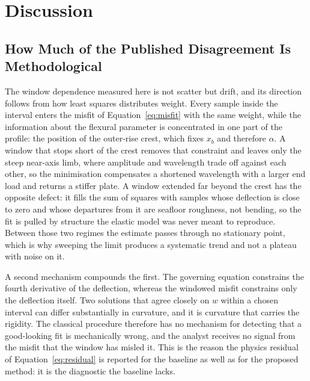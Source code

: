 \documentclass[final]{agujournal2019}
\begin{document}
\section{Discussion}\label{sec:discussion}

\subsection{How Much of the Published Disagreement Is Methodological}\label{sec:disc:window}

The window dependence measured here is not scatter but drift, and its direction
follows from how least squares distributes weight. Every sample inside the
interval enters the misfit of Equation~\eqref{eq:misfit} with the same weight,
while the information about the flexural parameter is concentrated in one part
of the profile: the position of the outer-rise crest, which fixes $x_{b}$ and
therefore $\alpha$. A window that stops short of the crest removes that
constraint and leaves only the steep near-axis limb, where amplitude and
wavelength trade off against each other, so the minimisation compensates a
shortened wavelength with a larger end load and returns a stiffer plate. A
window extended far beyond the crest has the opposite defect: it fills the sum
of squares with samples whose deflection is close to zero and whose departures
from it are seafloor roughness, not bending, so the fit is pulled by
structure the elastic model was never meant to reproduce. Between those two
regimes the estimate passes through no stationary point, which is why sweeping
the limit produces a systematic trend and not a plateau with noise on it.

A second mechanism compounds the first. The governing equation constrains the
fourth derivative of the deflection, whereas the windowed misfit constrains only
the deflection itself. Two solutions that agree closely on $w$ within a chosen
interval can differ substantially in curvature, and it is curvature that carries
the rigidity. The classical procedure therefore has no mechanism for detecting
that a good-looking fit is mechanically wrong, and the analyst receives no
signal from the misfit that the window has misled it. This is the reason the
physics residual of Equation~\eqref{eq:residual} is reported for the baseline as
well as for the proposed method: it is the diagnostic the baseline lacks.
\end{document}
